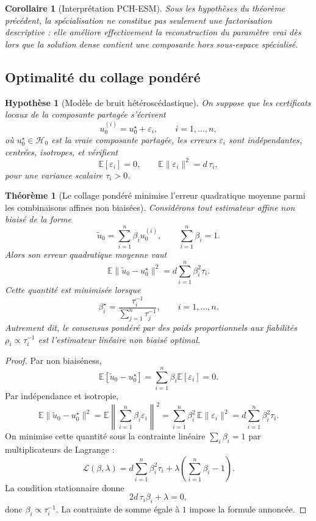 \documentclass[11pt,a4paper]{article}
\newtheorem{assumption}{Hypothèse}[section]
\newtheorem{theorem}{Théorème}[section]
\newtheorem{corollary}{Corollaire}[section]
\newcommand{\Hh}{\mathcal H}
\newcommand{\1}{\mathbf 1}
\begin{document}
\begin{corollary}[Interprétation PCH-ESM]
Sous les hypothèses du théorème précédent, la spécialisation ne constitue pas seulement une factorisation descriptive :
elle améliore effectivement la reconstruction du paramètre vrai dès lors que la solution dense contient une composante hors sous-espace spécialisé.
\end{corollary}

\subsection{Optimalité du collage pondéré}

\begin{assumption}[Modèle de bruit hétéroscédastique]
On suppose que les certificats locaux de la composante partagée s'écrivent
\[
u_0^{(i)} = u_0^\star + \varepsilon_i,
\qquad i=1,\dots,n,
\]
où \(u_0^\star\in\Hh_0\) est la vraie composante partagée, les erreurs \(\varepsilon_i\) sont indépendantes,
centrées, isotropes, et vérifient
\[
\mathbb E[\varepsilon_i]=0,
\qquad
\mathbb E\|\varepsilon_i\|^2 = d\,\tau_i,
\]
pour une variance scalaire \(\tau_i>0\).
\end{assumption}

\begin{theorem}[Le collage pondéré minimise l'erreur quadratique moyenne parmi les combinaisons affines non biaisées]
Considérons tout estimateur affine non biaisé de la forme
\[
\tilde u_0=\sum_{i=1}^n \beta_i u_0^{(i)},
\qquad
\sum_{i=1}^n \beta_i=1.
\]
Alors son erreur quadratique moyenne vaut
\[
\mathbb E\|\tilde u_0-u_0^\star\|^2
=
d\sum_{i=1}^n \beta_i^2 \tau_i.
\]
Cette quantité est minimisée lorsque
\[
\beta_i^\star
=
\frac{\tau_i^{-1}}{\sum_{j=1}^n \tau_j^{-1}},
\qquad i=1,\dots,n.
\]
Autrement dit, le consensus pondéré par des poids proportionnels aux fiabilités
\(\rho_i\propto \tau_i^{-1}\) est l'estimateur linéaire non biaisé optimal.
\end{theorem}

\begin{proof}
Par non biaiséness,
\[
\mathbb E[\tilde u_0-u_0^\star]
=
\sum_{i=1}^n \beta_i \mathbb E[\varepsilon_i]
=
0.
\]
Par indépendance et isotropie,
\[
\mathbb E\|\tilde u_0-u_0^\star\|^2
=
\mathbb E\left\|\sum_{i=1}^n \beta_i\varepsilon_i\right\|^2
=
\sum_{i=1}^n \beta_i^2\,\mathbb E\|\varepsilon_i\|^2
=
d\sum_{i=1}^n \beta_i^2\tau_i.
\]
On minimise cette quantité sous la contrainte linéaire \(\sum_i \beta_i=1\) par multiplicateurs de Lagrange :
\[
\mathcal L(\beta,\lambda)
=
d\sum_{i=1}^n \beta_i^2\tau_i
+
\lambda\left(\sum_{i=1}^n \beta_i-1\right).
\]
La condition stationnaire donne
\[
2d\,\tau_i\beta_i+\lambda=0,
\]
donc \(\beta_i\propto \tau_i^{-1}\). La contrainte de somme égale à \(1\) impose la formule annoncée.
\end{proof}
\end{document}
